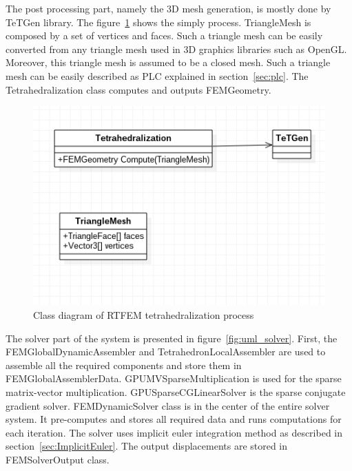 \documentclass[en]{minipw} %
\begin{document}
The post processing part, namely the 3D mesh generation, is mostly done by TeTGen library. The figure~\ref{fig:uml_tetrahedralization} shows the simply process. TriangleMesh is composed by a set of vertices and faces. Such a triangle mesh can be easily converted from any triangle mesh used in 3D graphics libraries such as OpenGL. Moreover, this triangle mesh is assumed to be a closed mesh. Such a triangle mesh can be easily described as PLC explained in section~\ref{sec:plc}. The Tetrahedralization class computes and outputs FEMGeometry.

\begin{figure}[h!]
\centering
\includegraphics[scale=0.6]{pictures/tetrahedralization.png}
\caption[Class diagram of RTFEM tetrahedralization process]{Class diagram of RTFEM tetrahedralization process}
\label{fig:uml_tetrahedralization}
\end{figure}

The solver part of the system is presented in figure~\ref{fig:uml_solver}. First, the FEMGlobalDynamicAssembler and TetrahedronLocalAssembler are used to assemble all the required components and store them in FEMGlobalAssemblerData. GPUMVSparseMultiplication is used for the sparse matrix-vector multiplication. GPUSparseCGLinearSolver is the sparse conjugate gradient solver. FEMDynamicSolver class is in the center of the entire solver system. It pre-computes and stores all required data and runs computations for each iteration. The solver uses implicit euler integration method as described in section~\ref{sec:ImplicitEuler}. The output displacements are stored in FEMSolverOutput class.
\end{document}
